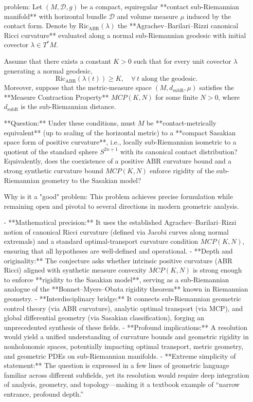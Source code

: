 problem:  
Let \((M, \mathcal{D}, g)\) be a compact, equiregular **contact sub-Riemannian manifold** with horizontal bundle \(\mathcal{D}\) and volume measure \(\mu\) induced by the contact form. Denote by \(\mathrm{Ric}_{\mathrm{ABR}}(\lambda)\) the **Agrachev–Barilari–Rizzi canonical Ricci curvature** evaluated along a normal sub-Riemannian geodesic with initial covector \(\lambda \in T^*M\).  

Assume that there exists a constant \(K>0\) such that for every unit covector \(\lambda\) generating a normal geodesic,  
\[
\mathrm{Ric}_{\mathrm{ABR}}(\lambda(t)) \ge K, \quad \forall\, t \text{ along the geodesic.}
\]  
Moreover, suppose that the metric-measure space \((M, d_{\mathrm{subR}}, \mu)\) satisfies the **Measure Contraction Property** \(MCP(K,N)\) for some finite \(N>0\), where \(d_{\mathrm{subR}}\) is the sub-Riemannian distance.  

**Question:**  
Under these conditions, must \(M\) be **contact-metrically equivalent** (up to scaling of the horizontal metric) to a **compact Sasakian space form of positive curvature**, i.e., locally sub-Riemannian isometric to a quotient of the standard sphere \(S^{2n+1}\) with its canonical contact distribution?  
Equivalently, does the coexistence of a positive ABR curvature bound and a strong synthetic curvature bound \(MCP(K,N)\) enforce rigidity of the sub-Riemannian geometry to the Sasakian model?  

Why is it a "good" problem:  
This problem achieves precise formulation while remaining open and pivotal to several directions in modern geometric analysis.  

- **Mathematical precision:** It uses the established Agrachev–Barilari–Rizzi notion of canonical Ricci curvature (defined via Jacobi curves along normal extremals) and a standard optimal-transport curvature condition \(MCP(K,N)\), ensuring that all hypotheses are well-defined and operational.  
- **Depth and originality:** The conjecture asks whether intrinsic positive curvature (ABR Ricci) aligned with synthetic measure convexity \(MCP(K,N)\) is strong enough to enforce **rigidity to the Sasakian model**, serving as a sub-Riemannian analogue of the **Bonnet–Myers–Obata rigidity theorem** known in Riemannian geometry.  
- **Interdisciplinary bridge:** It connects sub-Riemannian geometric control theory (via ABR curvature), analytic optimal transport (via MCP), and global differential geometry (via Sasakian classification), forging an unprecedented synthesis of these fields.  
- **Profound implications:** A resolution would yield a unified understanding of curvature bounds and geometric rigidity in nonholonomic spaces, potentially impacting optimal transport, metric geometry, and geometric PDEs on sub-Riemannian manifolds.  
- **Extreme simplicity of statement:** The question is expressed in a few lines of geometric language familiar across different subfields, yet its resolution would require deep integration of analysis, geometry, and topology—making it a textbook example of “narrow entrance, profound depth.”